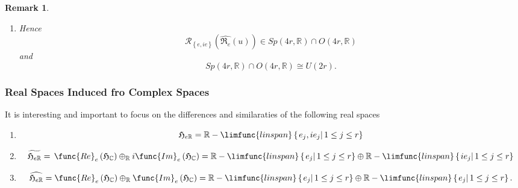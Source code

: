 \documentclass[aps,preprint]{revtex4}
\newtheorem{remark}[theorem]{Remark}
\begin{document}
\begin{remark}
\begin{enumerate}
\begin{enumerate}
\item Hence 
\begin{equation}
\mathcal{R}_{\left\{ e,ie\right\} }\left( \widehat{\mathfrak{R}_{e}}\left(
u\right) \right) \in Sp\left( 4r,\mathbb{R}\right) \cap O\left( 4r,\mathbb{R}%
\right)
\end{equation}%
and 
\begin{equation}
Sp\left( 4r,\mathbb{R}\right) \cap O\left( 4r,\mathbb{R}\right) \cong
U\left( 2r\right) .
\end{equation}
\end{enumerate}
\end{enumerate}
\end{remark}

\subsubsection{Real Spaces Induced fro Complex Spaces}

\bigskip It is interesting and important to focus on the differences and
similaraties of the following real spaces

\begin{enumerate}
\item 
\begin{equation}
\mathfrak{H}_{e\mathbb{R}}=\mathbb{R}-\limfunc{linspan}\left\{ \left.
e_{j},ie_{j}\right\vert 1\leq j\leq r\right\}
\end{equation}

\item 
\begin{equation}
\widetilde{\mathfrak{H}_{e\mathbb{R}}}=\,\func{Re}_{e}\left( \mathfrak{H}_{%
\mathbb{C}}\right) \oplus _{\mathbb{R}}i\func{Im}_{e}\left( \mathfrak{H}_{%
\mathbb{C}}\right) =\mathbb{R}-\limfunc{linspan}\left\{ \left.
e_{j}\right\vert 1\leq j\leq r\right\} \oplus \mathbb{R}-\limfunc{linspan}%
\left\{ \left. ie_{j}\right\vert 1\leq j\leq r\right\}
\end{equation}

\item 
\begin{equation}
\widehat{\mathfrak{H}_{e\mathbb{R}}}=\func{Re}_{e}\left( \mathfrak{H}_{%
\mathbb{C}}\right) \oplus _{\mathbb{R}}\func{Im}_{e}\left( \mathfrak{H}_{%
\mathbb{C}}\right) =\mathbb{R}-\limfunc{linspan}\left\{ \left.
e_{j}\right\vert 1\leq j\leq r\right\} \oplus \mathbb{R}-\limfunc{linspan}%
\left\{ \left. e_{j}\right\vert 1\leq j\leq r\right\} .
\end{equation}
\end{enumerate}
\end{document}
